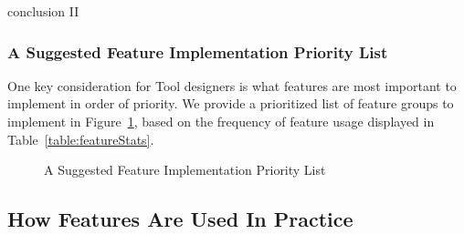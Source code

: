 conclusion II

\subsubsection{A Suggested Feature Implementation Priority List}

One key consideration for Tool designers is what features are most important to implement in order of priority.  We provide a prioritized list of feature groups to implement in Figure~\ref{suggestfeaturepriority}, based on the frequency of feature usage displayed in Table~\ref{table:featureStats}.


\begin{figure}[tb]
\caption{A Suggested Feature Implementation Priority List \label{suggestfeaturepriority}
}
\end{figure}

\subsection{How Features Are Used In Practice}



